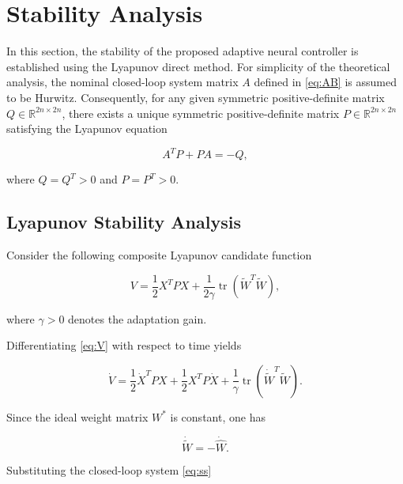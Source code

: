 \section{Stability Analysis}

In this section, the stability of the proposed adaptive neural controller is established using the Lyapunov direct method. For simplicity of the theoretical analysis, the nominal closed-loop system matrix $A$ defined in \eqref{eq:AB} is assumed to be Hurwitz. Consequently, for any given symmetric positive-definite matrix $Q\in\mathbb{R}^{2n\times2n}$, there exists a unique symmetric positive-definite matrix $P\in\mathbb{R}^{2n\times2n}$ satisfying the Lyapunov equation

\begin{equation}
	A^{T}P+PA=-Q,
	\label{eq:lyapunov}
\end{equation}

where $Q=Q^{T}>0$ and $P=P^{T}>0$.


\subsection{Lyapunov Stability Analysis}

Consider the following composite Lyapunov candidate function

\begin{equation}
	V
	=
	\frac12
	X^{T}PX
	+
	\frac{1}{2\gamma}
	\operatorname{tr}
	\left(
	\tilde W^{T}\tilde W
	\right),
	\label{eq:V}
\end{equation}

where $\gamma>0$ denotes the adaptation gain.

Differentiating \eqref{eq:V} with respect to time yields

\begin{equation}
	\dot V
	=
	\frac12
	\dot X^{T}PX
	+
	\frac12
	X^{T}P\dot X
	+
	\frac1\gamma
	\operatorname{tr}
	\left(
	\dot{\tilde W}^{T}\tilde W
	\right).
	\label{eq:Vdot1}
\end{equation}

Since the ideal weight matrix $W^{*}$ is constant, one has

\begin{equation}
	\dot{\tilde W}
	=
	-
	\dot{\hat W}.
	\label{eq:weightdot}
\end{equation}

Substituting the closed-loop system \eqref{eq:ss}

